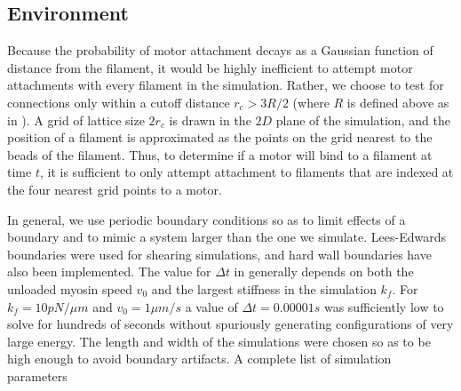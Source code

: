 \documentclass[12pt]{article} \usepackage{times} \usepackage{graphicx}
\begin{document}
\subsection{Environment} \par Because the probability of motor attachment
decays as a Gaussian function of distance from the filament, it would be highly
inefficient to attempt motor attachments with every filament in the simulation.
Rather, we choose to test for connections only within a cutoff distance
$r_c>3R/2$ (where $R$ is defined above as in ). A grid of
lattice size $2r_c$ is drawn in the $2D$ plane of the simulation, and the
position of a filament is approximated as the points on the grid nearest to the
beads of the filament. Thus, to determine if a motor will bind to a filament at
time $t$, it is sufficient to only attempt attachment to filaments that are
indexed at the four nearest grid points to a motor.  \par In general, we use
periodic boundary conditions so as to limit effects of a boundary and to mimic
a system larger than the one we simulate. Lees-Edwards boundaries \cite{allen}
were used for shearing simulations, and hard wall boundaries have also been
implemented.  The value for $\Delta t$ in  generally
depends on both the unloaded myosin speed $v_0$ and the largest stiffness in
the simulation $k_f$. For $k_f = 10pN/\mu m$ and $v_0=1\mu m/s$ a value of
$\Delta t = 0.00001 s$ was sufficiently low to solve  for
hundreds of seconds without spuriously generating configurations of very large
energy.  The length and width of the simulations were chosen so as to be high
enough to avoid boundary artifacts.  A complete list of simulation parameters
\end{document}
